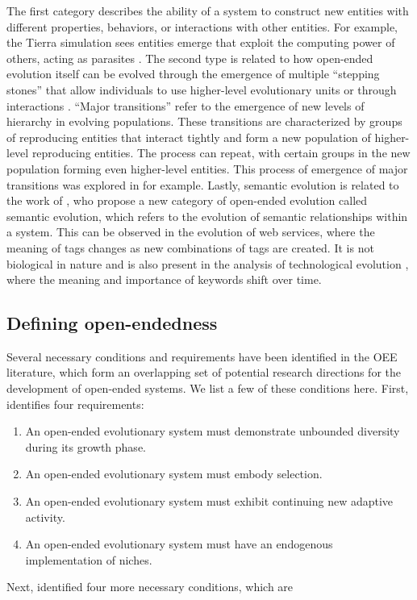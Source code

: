 The first category describes the ability of a system to construct new entities
with different properties, behaviors, or interactions with other entities. For
example, the Tierra simulation sees entities emerge that exploit the computing
power of others, acting as parasites \parencite{rayApproachSynthesisLife1991}.
The second type is related to how open-ended evolution itself can be evolved
through the emergence of multiple ``stepping stones'' that allow individuals to use higher-level evolutionary units or through interactions
\parencite{patteeEvolvedOpenEndednessNot2019}. ``Major transitions'' refer to
the emergence of new levels of hierarchy in evolving populations. These
transitions are characterized by groups of reproducing entities that
interact tightly and form a new population of higher-level reproducing entities.
The process can repeat, with certain groups in the new population forming even
higher-level entities. This process of emergence of major transitions was
explored in \parencite{sayamaCardinalityLeapOpenEnded2019,
  morenoOpenEndedFraternalTransitions2019} for example. Lastly, semantic
evolution is related to the work of
\textcite{ikegamiOpenEndedEvolutionMechanism2019}, who propose a new category of
open-ended evolution called semantic evolution, which refers to the evolution of
semantic relationships within a system. This can be observed in the evolution of
web services, where the meaning of tags changes as new combinations of tags are
created. It is not biological in nature and is also present in the analysis of
technological evolution \parencite{bedauOpenEndedTechnologicalInnovation2019},
where the meaning and importance of keywords shift over time.

\subsection{Defining open-endedness}

Several necessary conditions and requirements have been identified in the
\ac{OEE} literature, which form an overlapping set of potential research
directions for the development of open-ended systems. We list a few of these conditions
here. First, \textcite{maleyFourStepsOpenended1999} identifies four requirements:

\begin{enumerate}
  \item An open-ended evolutionary system must demonstrate unbounded diversity
        during its growth phase.
  \item An open-ended evolutionary system must embody selection.
  \item An open-ended evolutionary system must exhibit continuing new adaptive
        activity.
  \item An open-ended evolutionary system must have an endogenous implementation
        of niches.
\end{enumerate}
Next, \textcite{sorosIdentifyingNecessaryConditions2014} identified four more necessary
conditions, which are

